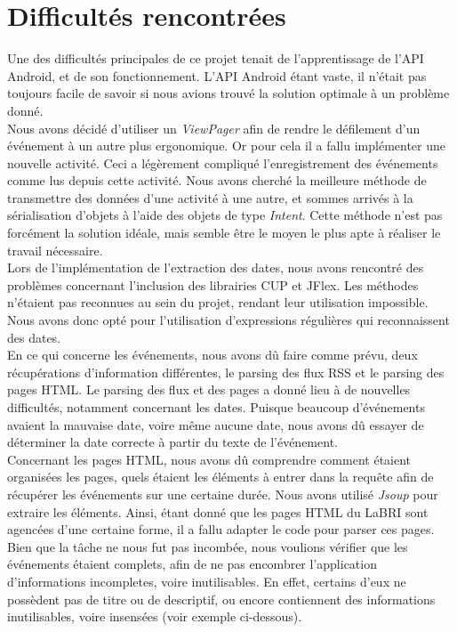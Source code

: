 \chapter{Difficultés rencontrées}

Une des difficultés principales de ce projet tenait de l’apprentissage de l’API Android, et de son fonctionnement. L’API Android étant vaste, il n’était pas toujours facile de savoir si nous avions trouvé la solution optimale à un problème donné.\\
Nous avons décidé d'utiliser un \emph{ViewPager} afin de rendre le défilement d’un événement à un autre plus ergonomique. Or pour cela il a fallu implémenter une nouvelle activité. Ceci a légèrement compliqué l'enregistrement des événements comme lus depuis cette activité. Nous avons cherché la meilleure méthode de transmettre des données d’une activité à une autre, et sommes arrivés à la sérialisation d’objets à l'aide des objets de type \emph{Intent}. Cette méthode n'est pas forcément la solution idéale, mais semble être le moyen le plus apte à réaliser le travail nécessaire. \\

Lors de l’implémentation de l’extraction des dates, nous avons rencontré des problèmes concernant l’inclusion des librairies CUP et JFlex. Les méthodes n’étaient pas reconnues au sein du projet, rendant leur utilisation impossible.
Nous avons donc opté pour l'utilisation d'expressions régulières qui reconnaissent des dates. \\

En ce qui concerne les événements, nous avons dû faire comme prévu, deux récupérations d’information différentes, le parsing des flux RSS et le parsing des pages HTML.
Le parsing des flux et des pages a donné lieu à de nouvelles difficultés, notamment concernant les dates. Puisque beaucoup d'événements avaient la mauvaise date, voire même aucune date, nous avons dû essayer de déterminer la date correcte à partir du texte de l'événement. \\

Concernant les pages HTML, nous avons dû comprendre comment étaient organisées les pages, quels étaient les éléments à entrer dans la requête afin de récupérer les événements sur une certaine durée. Nous avons utilisé \emph{Jsoup} pour extraire les éléments. Ainsi, étant donné que les pages HTML du LaBRI sont agencées d'une certaine forme, il a fallu adapter le code pour parser ces pages.
Bien que la tâche ne nous fut pas incombée, nous voulions vérifier que les événements étaient complets, afin de ne pas encombrer l'application d'informations incompletes, voire inutilisables. En effet, certains d’eux ne possèdent pas de titre ou de descriptif, ou encore contiennent des informations inutilisables, voire insensées (voir exemple ci-dessous).

